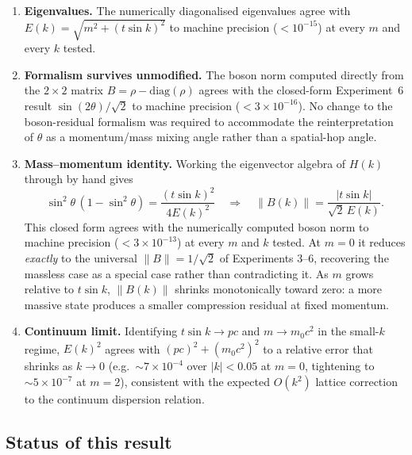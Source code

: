 \documentclass[11pt]{article}
\begin{document}
\begin{enumerate}
  \item \textbf{Eigenvalues.} The numerically diagonalised eigenvalues agree
        with $E(k) = \sqrt{m^2 + (t\sin k)^2}$ to machine precision
        ($< 10^{-15}$) at every $m$ and every $k$ tested.
  \item \textbf{Formalism survives unmodified.} The boson norm computed
        directly from the $2\times2$ matrix $B = \rho - \mathrm{diag}(\rho)$
        agrees with the closed-form Experiment~6 result
        $\sin(2\theta)/\sqrt{2}$ to machine precision
        ($< 3\times 10^{-16}$). No change to the boson-residual formalism
        was required to accommodate the reinterpretation of $\theta$ as a
        momentum/mass mixing angle rather than a spatial-hop angle.
  \item \textbf{Mass--momentum identity.} Working the eigenvector algebra of
        $H(k)$ through by hand gives
        \[
          \sin^2\theta\,(1-\sin^2\theta) = \frac{(t\sin k)^2}{4E(k)^2}
          \quad\Longrightarrow\quad
          \boxed{\|B(k)\| = \frac{|t\sin k|}{\sqrt{2}\,E(k)}.}
        \]
        This closed form agrees with the numerically computed boson norm to
        machine precision ($< 3\times 10^{-13}$) at every $m$ and $k$ tested.
        At $m = 0$ it reduces \emph{exactly} to the universal
        $\|B\| = 1/\sqrt{2}$ of Experiments 3--6, recovering the massless
        case as a special case rather than contradicting it. As $m$ grows
        relative to $t\sin k$, $\|B(k)\|$ shrinks monotonically toward zero:
        a more massive state produces a smaller compression residual at
        fixed momentum.
  \item \textbf{Continuum limit.} Identifying $t\sin k \to p c$ and $m \to
        m_0 c^2$ in the small-$k$ regime, $E(k)^2$ agrees with
        $(pc)^2 + (m_0c^2)^2$ to a relative error that shrinks as $k \to 0$
        (e.g.\ $\sim 7\times 10^{-4}$ over $|k|<0.05$ at $m=0$, tightening
        to $\sim 5\times 10^{-7}$ at $m=2$), consistent with the expected
        $O(k^2)$ lattice correction to the continuum dispersion relation.
\end{enumerate}

\subsection*{Status of this result}
\end{document}

